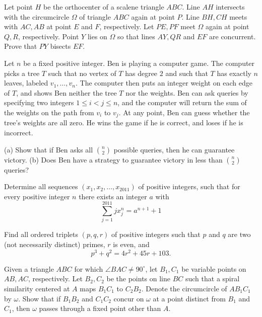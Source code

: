 \documentclass[11pt]{scrartcl}
\begin{document}
\begin{problem}[844684477828422]
Let point $H$ be the orthocenter of a scalene triangle $ABC$. Line $AH$ intersects with the circumcircle $\Omega$ of triangle $ABC$ again at point $P$. Line $BH, CH$ meets with $AC,AB$ at point $E$ and $F$, respectively. Let $PE, PF$ meet $\Omega$ again at point $Q,R$, respectively. Point $Y$ lies on $\Omega$ so that lines $AY,QR$ and $EF$ are concurrent. Prove that $PY$ bisects $EF$.
\end{problem}
\begin{problem}[846826818545123]
	Let $n$ be a fixed positive integer. Ben is playing a computer game. The computer picks a tree $T$ such that no vertex of $T$ has degree $2$ and such that $T$ has exactly $n$ leaves, labeled $v_1,\ldots, v_n$. The computer then puts an integer weight on each edge of $T$, and shows Ben neither the tree $T$ nor the weights. Ben can ask queries by specifying two integers $1\leq i < j \leq n$, and the computer will return the sum of the weights on the path from $v_i$ to $v_j$. At any point, Ben can guess whether the tree's weights are all zero. He wins the game if he is correct, and loses if he is incorrect.

(a) Show that if Ben asks all $\binom n2$ possible queries, then he can guarantee victory.
(b) Does Ben have a strategy to guarantee victory in less than $\binom n2$ queries?
\end{problem}
\begin{problem}[848370325196914]
Determine all sequences $(x_1,x_2,\ldots,x_{2011})$ of positive integers, such that for every positive integer $n$ there exists an integer $a$ with\[\sum^{2011}_{j=1} j  x^n_j = a^{n+1} + 1\]
\end{problem}
\begin{problem}[849916170311036]
	Find all ordered triplets $(p,q,r)$ of positive integers such that $p$ and $q$ are two (not necessarily distinct) primes, $r$ is even, and
\[p^3+q^2=4r^2+45r+103.\]
\end{problem}
\begin{problem}[852531542088551]
	Given a triangle $ABC$ for which $\angle BAC \neq 90^{\circ}$, let $B_1, C_1$ be variable points on $AB,AC$, respectively. Let $B_2,C_2$ be the points on line $BC$ such that a spiral similarity centered at $A$ maps $B_1C_1$ to $C_2B_2$. Denote the circumcircle of $AB_1C_1$ by $\omega$. Show that if $B_1B_2$ and $C_1C_2$ concur on $\omega$ at a point distinct from $B_1$ and $C_1$, then $\omega$ passes through a fixed point other than $A$.
\end{problem}
\end{document}
